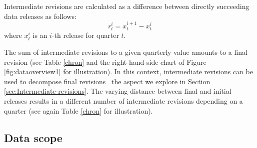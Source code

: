 Intermediate revisions are calculated as a difference between directly succeeding data releases as follows:
\[
r_{t}^{i}=x_{t}^{i+1}-x_{t}^{i}
\]
where $x_{t}^{i}$ is an $i$-th release for quarter $t$. 

The sum of intermediate revisions to a given quarterly value amounts to a final revision (see Table \ref{chron} and the right-hand-side chart of Figure \ref{fig:dataoverview1} for illustration). In this context, intermediate revisions can be used to decompose final revisions
\textemdash~the aspect we explore in Section \ref{sec:Intermediate-revisions}. The varying distance between final and initial releases results in a different number of intermediate revisions depending on a quarter (see again Table \ref{chron} for illustration).

% 


\subsection{Data scope}

